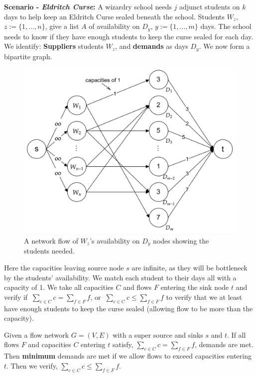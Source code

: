 \newpage

\noindent
\textbf{Scenario - \textit{Eldritch Curse}:} A wizardry school needs $j$ adjunct students on 
$k$ days to help keep an Eldritch Curse sealed beneath the school. Students $W_z$, $z:=\{1,\dots,n\}$, give a list $A$ of availability on
$D_y$, $y:=\{1,\dots,m\}$ days. The school needs to know if they have enough students to keep the curse sealed for each day.\\

\noindent
We identify: \textbf{Suppliers} students $W_z$, and \textbf{demands} as days $D_y$. We now form a bipartite graph.

\begin{figure}[h]
    \centering
    \includegraphics[width=.7\textwidth]{Sections/net/wizards.png}
    \caption{A network flow of $W_z$'s availability on $D_y$ nodes showing the students needed.}
\end{figure}

\noindent
Here the capacities leaving source node $s$ are infinite, as they will be bottleneck by the students' availability. 
We match each student to their days all with a capacity of 1. We take all capacities $C$ and flows $F$ entering the sink node $t$
and verify if $\ \displaystyle{\sum_{c\in C} c = \sum_{f\in F} f}$, or $\ \displaystyle{\sum_{c\in C} c \leq \sum_{f\in F} f}$ 
to verify that we at least have enough students to keep the curse sealed (allowing flow to be more than the capacity).
\begin{theo}

    Given a flow network $G=(V,E)$ with a super source and sinks $s$ and $t$. If all flows $F$ and capacities $C$ entering $t$ satisfy,
    $\displaystyle{\sum_{c\in C} c = \sum_{f\in F} f}$, demands are met. Then \textbf{minimum} demands are met if we allow flows to exceed
    capacities entering $t$. Then we verify, $\displaystyle{\sum_{c\in C} c \leq \sum_{f\in F} f}$.
\end{theo}


